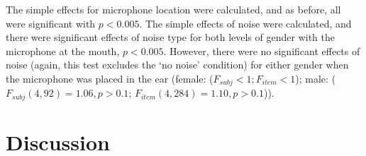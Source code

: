 The simple effects for microphone location were calculated, and as before, all were significant with $p<0.005$.  The simple effects of noise were calculated, and there were significant effects of noise type for both levels of gender with the microphone at the mouth, $p<0.005$.  However, there were no significant effects of noise (again, this test excludes the `no noise' condition) for either gender when the microphone was placed in the ear (female: ($F_{subj}<1; F_{item}<1$); male: ($F_{subj}(4,92)=1.06, p>0.1$; $F_{item}(4,284)=1.10, p>0.1$)).


% 
% 
% 
% 




\section{Discussion}\label{chap3:discussion}

